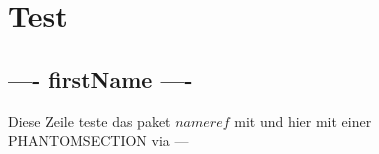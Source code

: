 \documentclass[../Report.tex]{subfiles}
\begin{document}
\chapter{Test}
\label{chap:test}


\section{---- firstName ----}
\label{sec:test_firstName}

Diese Zeile teste das paket $ nameref$ mit  und hier mit einer PHANTOMSECTION via ---

%
%
%		
%		
%
%
%
%
%
%		
%
\end{document}
